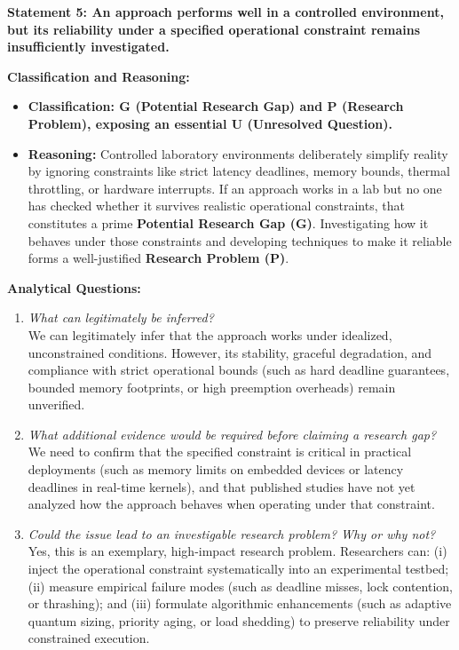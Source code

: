 \documentclass[11pt]{article}
\newcommand{\qLabel}[1]{
    {\fontsize{12}{14.4}\selectfont \textbf{#1}}
}
\begin{document}
\vspace{1.2em}


\newpage
\qLabel{Statement 5: An approach performs well in a controlled environment, but its reliability under a specified operational constraint remains insufficiently investigated.}
\vspace{0.4em}

\noindent\textbf{Classification and Reasoning:}
\begin{itemize}[leftmargin=1.5em]
    \item \textbf{Classification: G (Potential Research Gap) and P (Research Problem), exposing an essential U (Unresolved Question).}
    \item \textbf{Reasoning:} Controlled laboratory environments deliberately simplify reality by ignoring constraints like strict latency deadlines, memory bounds, thermal throttling, or hardware interrupts. If an approach works in a lab but no one has checked whether it survives realistic operational constraints, that constitutes a prime \textbf{Potential Research Gap (G)}. Investigating how it behaves under those constraints and developing techniques to make it reliable forms a well-justified \textbf{Research Problem (P)}.
\end{itemize}

\noindent\textbf{Analytical Questions:}
\begin{enumerate}[leftmargin=1.5em]
    \item \textit{What can legitimately be inferred?} \\
    We can legitimately infer that the approach works under idealized, unconstrained conditions. However, its stability, graceful degradation, and compliance with strict operational bounds (such as hard deadline guarantees, bounded memory footprints, or high preemption overheads) remain unverified.
    \item \textit{What additional evidence would be required before claiming a research gap?} \\
    We need to confirm that the specified constraint is critical in practical deployments (such as memory limits on embedded devices or latency deadlines in real-time kernels), and that published studies have not yet analyzed how the approach behaves when operating under that constraint.
    \item \textit{Could the issue lead to an investigable research problem? Why or why not?} \\
    Yes, this is an exemplary, high-impact research problem. Researchers can: (i) inject the operational constraint systematically into an experimental testbed; (ii) measure empirical failure modes (such as deadline misses, lock contention, or thrashing); and (iii) formulate algorithmic enhancements (such as adaptive quantum sizing, priority aging, or load shedding) to preserve reliability under constrained execution.
\end{enumerate}
\end{document}
